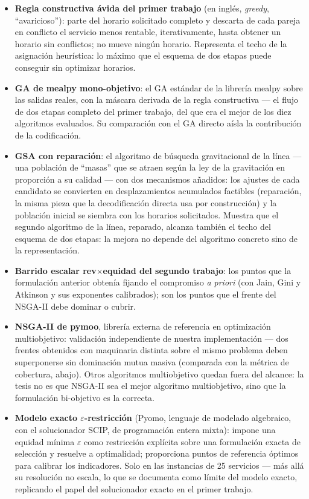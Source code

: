 \documentclass[11pt,a4paper]{article}
\begin{document}
\begin{itemize}
\item \textbf{Regla constructiva ávida del primer trabajo} (en inglés,
\emph{greedy}, ``avaricioso''): parte del horario solicitado completo y
descarta de cada pareja en conflicto el servicio menos rentable,
iterativamente, hasta obtener un horario sin conflictos; no mueve ningún
horario. Representa el techo de la asignación heurística: lo máximo que el
esquema de dos etapas puede conseguir sin optimizar horarios.
\item \textbf{GA de mealpy mono-objetivo}: el GA estándar de la librería
mealpy \cite{mealpy} sobre las salidas reales, con la máscara derivada de
la regla constructiva --- el flujo de dos etapas completo del primer
trabajo, del que era el mejor de los diez algoritmos evaluados. Su
comparación con el GA directo aísla la contribución de la codificación.
\item \textbf{GSA con reparación}: el algoritmo de búsqueda gravitacional
de la línea --- una población de ``masas'' que se atraen según la ley de
la gravitación en proporción a su calidad --- con dos mecanismos añadidos:
los ajustes de cada candidato se convierten en desplazamientos acumulados
factibles (reparación, la misma pieza que la decodificación directa usa por
construcción) y la población inicial se siembra con los horarios
solicitados. Muestra que el segundo algoritmo de la línea, reparado,
alcanza también el techo del esquema de dos etapas: la mejora no depende
del algoritmo concreto sino de la representación.
\item \textbf{Barrido escalar rev$\times$equidad del segundo trabajo}: los
puntos que la formulación anterior obtenía fijando el compromiso \emph{a
priori} (con Jain, Gini y Atkinson y sus exponentes calibrados); son los
puntos que el frente del NSGA-II debe dominar o cubrir.
\item \textbf{NSGA-II de pymoo}, librería externa de referencia en
optimización multiobjetivo: validación independiente de nuestra
implementación --- dos frentes obtenidos con maquinaria distinta sobre el
mismo problema deben superponerse sin dominación mutua masiva (comparada
con la métrica de cobertura, abajo). Otros algoritmos multiobjetivo quedan
fuera del alcance: la tesis no es que NSGA-II sea el mejor algoritmo
multiobjetivo, sino que la formulación bi-objetivo es la correcta.
\item \textbf{Modelo exacto $\varepsilon$-restricción} (Pyomo, lenguaje de
modelado algebraico, con el solucionador SCIP, de programación entera
mixta): impone una equidad mínima $\varepsilon$ como restricción explícita
sobre una formulación exacta de selección y resuelve a optimalidad;
proporciona puntos de referencia óptimos para calibrar los indicadores.
Solo en las instancias de 25 servicios --- más allá su resolución no
escala, lo que se documenta como límite del modelo exacto, replicando el
papel del solucionador exacto en el primer trabajo.
\end{itemize}
\end{document}
